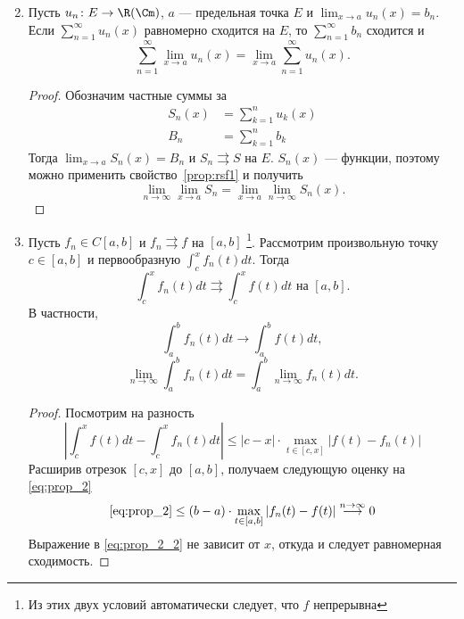 \begin{enumerate}
	\setcounter{enumi}{1}
\item {} Пусть $ u_n \colon E \to  \R(\Cm)$, $ a$ --- предельная точка $ E$ и $ \lim_{x \to  a} u_n(x) = b_n$. Если $ \sum_{n=1}^{\infty}u_n(x) $ равномерно сходится на $ E$, то   $ \sum_{n=1}^{\infty} b_n$ сходится и
	\[
		\sum_{n=1}^{\infty}  \lim_{x \to  a} u_n(x) = \lim_{x \to  a} \sum_{n=1}^{\infty} u_n(x)
	.\]
	\begin{proof}
		Обозначим частные суммы за
		\[
			\begin{aligned}
				S_n(x) &= \sum_{k=1}^{n} u_k(x) \\
				B_n &= \sum_{k=1}^{n} b_k
			\end{aligned}
		\]
		Тогда $ \lim_{x \to  a} S_n(x) = B_n$ и $ S_n \rightrightarrows S$ на $ E$.  $ S_n(x)$ --- функции, поэтому можно применить свойство~\ref{prop:rsf1} и получить
		\[
			\lim_{n \to \infty} \lim_{x \to a} S_n = \lim_{x \to a} \lim_{n \to \infty} S_n(x)
		.\]
	\end{proof}
\item {} Пусть  $ f_n \in C[a, b]$ и $ f_{n} \rightrightarrows f$ на $ [a, b]$ \footnote{Из этих двух условий автоматически следует, что $ f$ непрерывна}. Рассмотрим произвольную точку  $ c \in [a, b]$ и первообразную $ \int_{c}^{x} f_{n}(t)dt $. Тогда 
	\[
		\int_{c}^{x} f_n(t)dt \rightrightarrows \int_{c}^{x} f(t)dt \text{ на } [a, b]  
	.\] 
	В частности,
	\[
		\int_{a}^{b} f_n(t)dt \to \int_{a}^{b} f(t) dt  
	,\] 
	\[
		\lim_{n \to \infty} \int_{a}^{b} f_n(t)dt = \int_{a}^{b} \lim_{n \to \infty} f_n(t)dt  
	.\] 
	\begin{proof}
	    Посмотрим на разность 
		\begin{equation}\label{eq:prop_2}
			\left| \int_{c}^{x} f(t) dt - \int_{c}^{x} f_n(t) dt   \right| \le \left| c  - x \right| \cdot \max_{t \in [c, x]} \left| f(t) - f_n(t) \right| 
		\end{equation}
		Расширив отрезок $ [c, x]$ до $ [a, b]$, получаем следующую оценку на \ref{eq:prop_2}
		\begin{equation}\label{eq:prop_2_2}
			\ref{eq:prop_2} \le (b-a) \cdot \max_{t \in [a, b]}\left| f_n(t) - f(t) \right| \stackrel{n \to  \infty}{\longrightarrow} 0
		\end{equation}
		Выражение в \ref{eq:prop_2_2} не зависит от $ x$, откуда и следует равномерная сходимость.
	\end{proof}

\end{enumerate}
